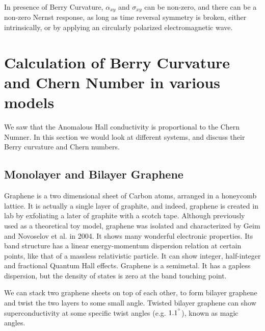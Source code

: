 \documentclass{report}
\begin{document}
In presence of Berry Curvature, $\alpha_{xy}$ and $\sigma_{xy}$ can be non-zero, and there can be a non-zero Nernst response, as long as time reversal symmetry is broken, either intrinsically, or by applying an circularly polarized electromagnetic wave.
\chapter{Calculation of Berry Curvature and Chern Number in various models}\label{chap:ChernNumber}
We saw that the Anomalous Hall conductivity is proportional to the Chern Numner. In this section we would look at different systems, and discuss their Berry curvature and Chern numbers.
\section{Monolayer and Bilayer Graphene}
Graphene is a two dimensional sheet of Carbon atoms, arranged in a honeycomb lattice. It is actually a single layer of graphite, and indeed, graphene is created in lab by exfoliating a later of graphite with a scotch tape. Although previously used as a theoretical toy model, graphene was isolated and characterized by Geim and Novoselov et al. \cite{NovoselovGeimGraphene666} in 2004. It shows many wonderful electronic properties. Its band structure has a linear energy-momentum dispersion \cite{NovoselovGrapheneDirac2005} relation at certain points, like that of a massless relativistic particle. It can show integer, half-integer \cite{Zhang2005GrapheneQHEBerry} and fractional \cite{Bolotin2009GrapheneFQHE} Quantum Hall effects. Graphene is a semimetal. It has a gapless dispersion, but the density of states is zero at the band touching point.

We can stack two graphene sheets on top of each other, to form bilayer graphene and twist the two layers to some small angle. Twisted bilayer graphene can show superconductivity \cite{Cao2018TBLSuperconductivity} at some specific twist angles (e.g. $1.1^{\degree}$), known as magic angles.
\end{document}
